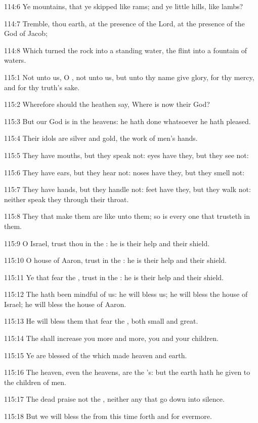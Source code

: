 114:6 Ye mountains, that ye skipped like rams; and ye little hills,
like lambs?

114:7 Tremble, thou earth, at the presence of the Lord, at the
presence of the God of Jacob;

114:8 Which turned the rock into a standing water, the flint into a
fountain of waters.



115:1 Not unto us, O \LORD, not unto us, but unto thy name give glory,
for thy mercy, and for thy truth's sake.

115:2 Wherefore should the heathen say, Where is now their God?

115:3 But our God is in the heavens: he hath done whatsoever he hath
pleased.

115:4 Their idols are silver and gold, the work of men's hands.

115:5 They have mouths, but they speak not: eyes have they, but they
see not:

115:6 They have ears, but they hear not: noses have they, but they
smell not:

115:7 They have hands, but they handle not: feet have they, but they
walk not: neither speak they through their throat.

115:8 They that make them are like unto them; so is every one that
trusteth in them.

115:9 O Israel, trust thou in the \LORD: he is their help and their
shield.

115:10 O house of Aaron, trust in the \LORD: he is their help and their
shield.

115:11 Ye that fear the \LORD, trust in the \LORD: he is their help and
their shield.

115:12 The \LORD hath been mindful of us: he will bless us; he will
bless the house of Israel; he will bless the house of Aaron.

115:13 He will bless them that fear the \LORD, both small and great.

115:14 The \LORD shall increase you more and more, you and your
children.

115:15 Ye are blessed of the \LORD which made heaven and earth.

115:16 The heaven, even the heavens, are the \LORD's: but the earth
hath he given to the children of men.

115:17 The dead praise not the \LORD, neither any that go down into
silence.

115:18 But we will bless the \LORD from this time forth and for
evermore.

